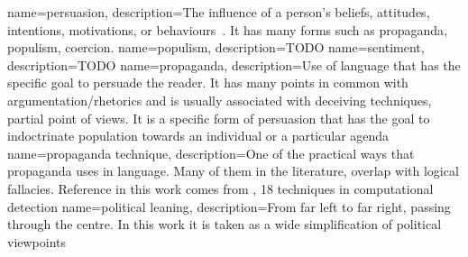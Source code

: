 {
        name=persuasion,
        description={The influence of a person's beliefs, attitudes, intentions, motivations, or behaviours~\cite{gass2018persuasion}. It has many forms such as \gls{propaganda}, \gls{populism}, coercion.}
}
{
        name=populism,
        description={TODO}
}
{
        name=sentiment,
        description={TODO}
}
{
        name=propaganda,
        description={Use of language that has the specific goal to persuade the reader. It has many points in common with argumentation/rhetorics and is usually associated with deceiving techniques, partial point of views. It is a specific form of persuasion that has the goal to indoctrinate population towards an individual or a particular agenda}
}
{
        name=propaganda technique,
        description={One of the practical ways that propaganda uses in language. Many of them in the literature, overlap with logical fallacies. Reference in this work comes from \cite{TODO}, 18 techniques in computational detection}
}
{
        name=political leaning,
        description={From far left to far right, passing through the centre. In this work it is taken as a wide simplification of political viewpoints}
}
